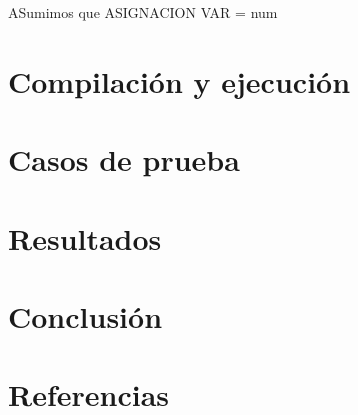 \documentclass[10pt,a4paper]{article}
\begin{document}
ASumimos que ASIGNACION \leftarrow VAR = num 


\section{Compilación y ejecución}

\section{Casos de prueba}

\section{Resultados}

\section{Conclusión}

\section{Referencias}
\end{document}
